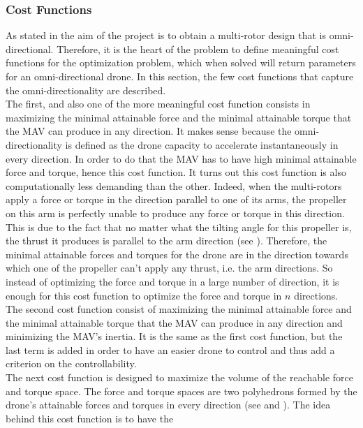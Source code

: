 \subsubsection{Cost Functions}
\label{sec:cost_functions}
As stated in  the aim of the project is to obtain a multi-rotor
design that is omni-directional. Therefore, it is the heart of the problem to
define meaningful cost functions for the optimization problem, which when
solved will return parameters for an omni-directional drone. In this section,
the few cost functions that capture the omni-directionality are described.\\
The first, and also one of the more meaningful cost function consists in maximizing
the minimal attainable force and the minimal attainable torque that the MAV can
produce in any direction. It makes sense because the
omni-directionality is defined as the drone capacity to accelerate instantaneously
in every direction. In order to do that the MAV has to have high minimal attainable
force and torque, hence this cost function. It turns out this cost function is also
computationally less demanding than the other. Indeed, when the multi-rotors apply a
force or torque in the direction parallel to one of its arms, the propeller on this arm
is perfectly unable to produce any force or torque in this direction. This is due to
the fact that no matter what the tilting angle for this propeller is, the thrust it
produces is parallel to the arm direction (see ). Therefore,
the minimal attainable forces and torques for the drone are in the direction towards which
one of the propeller can't apply any thrust, i.e. the arm directions. So instead of optimizing the force
and torque in a large number of direction, it is enough for this cost function to
optimize the force and torque in $n$ directions.\\
The second cost function consist of maximizing the minimal attainable force
and the minimal attainable torque that the MAV can produce in any direction
and minimizing the MAV’s inertia. It is the same as the first cost function, but
the last term is added in order to have an easier drone to control and thus add
a criterion on the controllability.\\
The next cost function is designed to maximize the volume of the reachable
force and torque space. The force and torque spaces are two polyhedrons formed
by the drone’s attainable forces and torques in every direction (see 
and ). The idea behind this cost function is to have the
